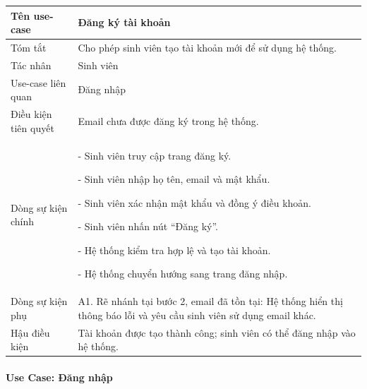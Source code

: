 \begin{longtable}{|>{\raggedright\arraybackslash}p{4.2cm}|>{\raggedright\arraybackslash}p{9.8cm}|}
	\hline
	Tên use-case & Đăng ký tài khoản \\ \hline
	Tóm tắt & Cho phép sinh viên tạo tài khoản mới để sử dụng hệ thống. \\ \hline
	Tác nhân & Sinh viên \\ \hline
	Use-case liên quan & Đăng nhập \\ \hline
	Điều kiện tiên quyết & Email chưa được đăng ký trong hệ thống. \\ \hline
	Dòng sự kiện chính &
	
		
- Sinh viên truy cập trang đăng ký.
		
- Sinh viên nhập họ tên, email và mật khẩu.
		
- Sinh viên xác nhận mật khẩu và đồng ý điều khoản.
		
- Sinh viên nhấn nút ``Đăng ký''.
		
- Hệ thống kiểm tra hợp lệ và tạo tài khoản.
		
- Hệ thống chuyển hướng sang trang đăng nhập.
	 \\ \hline
	Dòng sự kiện phụ & A1. Rẽ nhánh tại bước 2, email đã tồn tại: Hệ thống hiển thị thông báo lỗi và yêu cầu sinh viên sử dụng email khác. \\ \hline
	Hậu điều kiện & Tài khoản được tạo thành công; sinh viên có thể đăng nhập vào hệ thống. \\ \hline
\end{longtable}

\paragraph{Use Case: Đăng nhập}
\label{sec:uc-dang-nhap}

